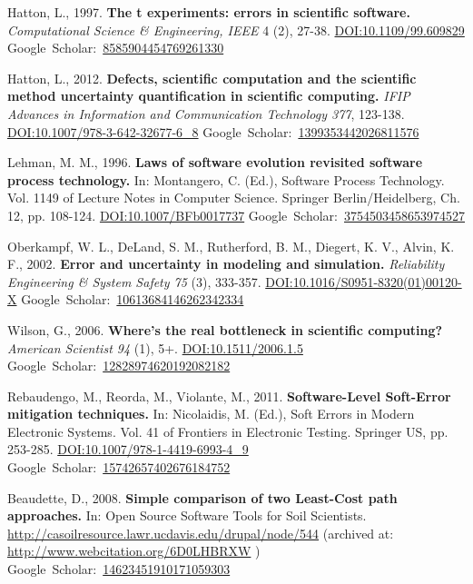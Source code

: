 \documentclass[a4paper,11pt]{article}
\newcommand{\gourl}[1]{\url{#1}}
\newcommand{\goDOI}[1]{\href{http://dx.doi.org/#1}{DOI:#1}}
\newcommand{\goScholar}[1]{{Google~Scholar}:~\href{http://scholar.google.com/scholar?cluster=#1}{#1}}
\begin{document}
\begin{footnotesize}
{\begin{thebibliography}{}
 Hatton, L., 1997. \textbf{The t experiments: errors in scientific software.} \emph{Computational Science \& Engineering, IEEE} 4 (2), 27-38. \goDOI{10.1109/99.609829} \goScholar{8585904454769261330}

 Hatton, L., 2012. \textbf{Defects, scientific computation and the scientific method uncertainty quantification in scientific computing.} \emph{IFIP Advances in Information and Communication Technology 377}, 123-138. \goDOI{10.1007/978-3-642-32677-6\_8} \goScholar{1399353442026811576}

 Lehman, M. M., 1996. \textbf{Laws of software evolution revisited software process technology.} In: Montangero, C. (Ed.), Software Process Technology. Vol. 1149 of Lecture Notes in Computer Science. Springer Berlin/Heidelberg, Ch. 12, pp. 108-124. \goDOI{10.1007/BFb0017737} \goScholar{3754503458653974527}

 Oberkampf, W. L., DeLand, S. M., Rutherford, B. M., Diegert, K. V., Alvin, K. F., 2002. \textbf{Error and uncertainty in modeling and simulation.} \emph{Reliability Engineering \& System Safety 75} (3), 333-357. \goDOI{10.1016/S0951-8320(01)00120-X} \goScholar{10613684146262342334}

 Wilson, G., 2006. \textbf{Where's the real bottleneck in scientific computing?} \emph{American Scientist 94} (1), 5+. \goDOI{10.1511/2006.1.5} \goScholar{12828974620192082182}

 Rebaudengo, M., Reorda, M., Violante, M., 2011. \textbf{Software-Level Soft-Error mitigation techniques.} In: Nicolaidis, M. (Ed.), Soft Errors in Modern Electronic Systems. Vol. 41 of Frontiers in Electronic Testing. Springer US, pp. 253-285. \goDOI{10.1007/978-1-4419-6993-4\_9} \goScholar{15742657402676184752}

 Beaudette, D., 2008. \textbf{Simple comparison of two Least-Cost path approaches.} In: Open Source Software Tools for Soil Scientists. \gourl {http://casoilresource.lawr.ucdavis.edu/drupal/node/544} (archived at: \gourl {http://www.webcitation.org/6D0LHBRXW} ) \goScholar{14623451910171059303}

\end{thebibliography}
}
\end{footnotesize}
\end{document}
